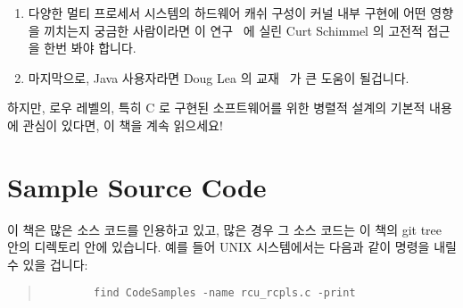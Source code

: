 \begin{enumerate}
\item	다양한 멀티 프로세서 시스템의 하드웨어 캐쉬 구성이 커널 내부 구현에
	어떤 영향을 끼치는지 궁금한 사람이라면 이
	연구~\cite{Schimmel:1994:USM:175689} 에 실린 Curt Schimmel 의 고전적
	접근을 한번 봐야 합니다.

\iffalse
\item	Those interested in learning how various types of multi-processor
	hardware
	cache organizations affect the implementation of kernel
	internals should take a look at Curt Schimmel's classic
	treatment of this subject~\cite{Schimmel:1994:USM:175689}.
\fi

\item	마지막으로, Java 사용자라면 Doug Lea 의
	교재~\cite{DougLea1997Textbook,Goetz2007Textbook} 가 큰 도움이
	될겁니다.

\iffalse
\item	Finally, those using Java might be well-served by Doug Lea's
	textbooks~\cite{DougLea1997Textbook,Goetz2007Textbook}.
\fi

\end{enumerate}

하지만, 로우 레벨의, 특히 C 로 구현된 소프트웨어를 위한 병렬적 설계의 기본적
내용에 관심이 있다면, 이 책을 계속 읽으세요!

\iffalse
However, if you are interested in principles of parallel design
for low-level software, especially software written in C, read on!
\fi

\section{Sample Source Code}
\label{sec:howto:Sample Source Code}

이 책은 많은 소스 코드를 인용하고 있고, 많은 경우 그 소스 코드는 이 책의 git
tree 안의  디렉토리 안에 있습니다.
예를 들어 UNIX 시스템에서는 다음과 같이 명령을 내릴 수 있을 겁니다:

\iffalse
This book discusses its fair share of source code, and in many cases
this source code may be found in the \co{CodeSamples} directory
of this book's git tree.
For example, on UNIX systems, you should be able to type the following:
\fi

\begin{quote}
	{\scriptsize
	\begin{verbatim}
		find CodeSamples -name rcu_rcpls.c -print
	\end{verbatim}
	}
\end{quote}

